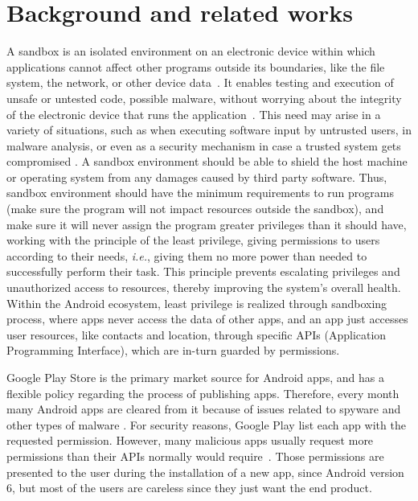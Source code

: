 \section{Background and related works}

A sandbox is an isolated environment on an electronic device within which applications cannot affect other programs outside its boundaries, like the file system, the network, or other device data~\cite{DBLP:journals/peerj-cs/MaassSCS16}. It enables testing and execution of unsafe or untested code, possible malware, without worrying about the integrity of the electronic device that runs the application~\cite{DBLP:conf/esorics/BordoniCS17}. This need may arise in a variety of situations, such as when executing software input by untrusted users, in malware analysis, or even as a security mechanism in case a trusted system gets compromised \cite{DBLP:journals/peerj-cs/MaassSCS16}.
A sandbox environment should be able to shield the host machine or operating system from any damages caused by third party software. Thus, sandbox environment should have the minimum requirements to run programs (make sure the program will not impact resources outside the sandbox), and make sure it will never assign the program greater privileges than it should have, 
working with the principle of the least privilege, giving permissions to users according to their needs, \textit{i.e.}, giving them no more power than needed to successfully perform their task. This principle prevents escalating privileges and unauthorized access to resources, thereby improving the system's overall health. Within the Android ecosystem, least privilege is realized through sandboxing process, where apps never access the data of other apps, and an app just accesses user resources, like contacts and location, through specific APIs (Application Programming Interface), which are in-turn guarded by permissions.

Google Play Store is the primary market source for Android apps, and has a flexible policy regarding the process of publishing apps. Therefore, every month many Android apps are cleared from it because of issues related to spyware and other types of malware \cite{DBLP:conf/msr/WangLL0X18}. For security reasons, Google Play list each app with the requested permission. However, many malicious apps usually request more permissions than their APIs normally would require~\cite{DBLP:conf/ccs/FeltCHSW11}. Those permissions are presented to the user during the installation of a new app, since Android version 6, but most of the users are careless since they just want the end product.~\cite{DBLP:conf/soups/FeltHEHCW12} 

